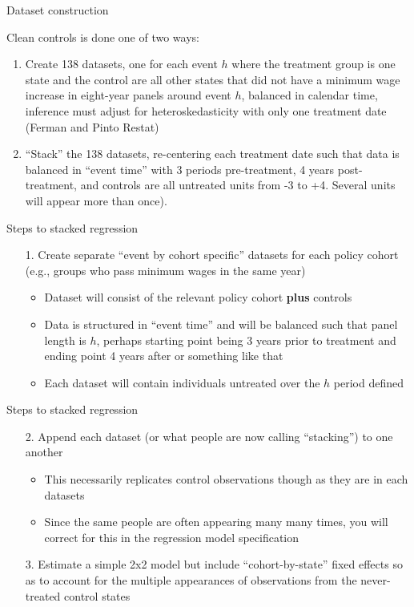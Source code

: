 \documentclass{beamer}
\begin{document}
\begin{frame}{Dataset construction}

Clean controls is done one of two ways:
	\begin{enumerate}
	\item Create 138 datasets, one for each event $h$ where the treatment group is one state and the control are all other states that did not have a minimum wage increase in eight-year panels around event $h$, balanced in calendar time, inference must adjust for heteroskedasticity with only one treatment date (Ferman and Pinto Restat)
	\item ``Stack'' the 138 datasets, re-centering each treatment date such that data is balanced in ``event time'' with 3 periods pre-treatment, 4 years post-treatment, and controls are all untreated units from -3 to +4. Several units will appear more than once).
	\end{enumerate}
\bigskip

\end{frame}



\begin{frame}{Steps to stacked regression}
\begin{enumerate}
    \item[1.]  Create separate ``event by cohort specific'' datasets for each policy cohort (e.g., groups who pass minimum wages in the same year)
        \begin{itemize}
        \item Dataset will consist of the relevant policy cohort \textbf{plus} controls
        \item Data is structured in ``event time'' and will be balanced such that panel length is $h$, perhaps starting point being 3 years prior to treatment and ending point 4 years after or something like that
        \item Each dataset will contain individuals untreated over the $h$ period defined
        \end{itemize}
\end{enumerate}
\end{frame}

\begin{frame}{Steps to stacked regression}
\begin{enumerate}
    \item[2. ] Append each dataset (or what people are now calling ``stacking'') to one another
        \begin{itemize}
        \item This necessarily replicates control observations though as they are in each datasets
        \item Since the same people are often appearing many many times, you will correct for this in the regression model specification
        \end{itemize}
    \item[3. ] Estimate a simple 2x2 model but include ``cohort-by-state'' fixed effects so as to account for the multiple appearances of observations from the never-treated control states
\end{enumerate}
\end{frame}
\end{document}
